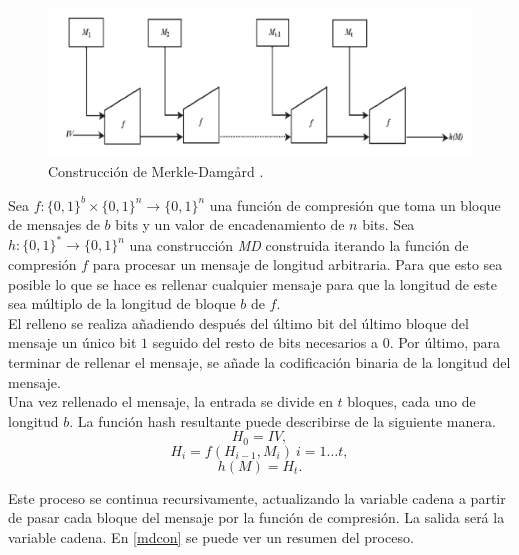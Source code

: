 \begin{figure}[htb]
	\centering
	\includegraphics[scale=0.3]{imagenes/md1.png} 
	\caption{Construcción de Merkle-Damgård \cite{Tiwari2017}.}
\end{figure}
Sea $f:\{0,1\}^b\times\{0,1\}^n\rightarrow\{0,1\}^n$ una función de compresión que toma un bloque de mensajes de $b$ bits y un valor de encadenamiento de $n$ bits. Sea $h:\{0,1\}^*\rightarrow\{0,1\}^n$ una construcción \emph{MD} construida iterando la función de compresión $f$ para procesar un mensaje de longitud arbitraria. Para que esto sea posible lo que se hace es rellenar cualquier mensaje para que la longitud de este sea múltiplo de la longitud de bloque $b$ de $f$.\\
El relleno se realiza añadiendo después del último bit del último bloque del mensaje un único bit $1$ seguido del resto de bits necesarios a $0$.
Por último, para terminar de rellenar el mensaje, se añade la codificación binaria de la longitud del mensaje.\\
Una vez rellenado el mensaje, la entrada se divide en $t$ bloques, cada uno de longitud $b$. La función hash resultante puede describirse de la siguiente manera.
$$
		H_0 = IV,
$$
$$
		H_i = f(H_{i-1},M_i)\:i=1\dots t,
$$
$$
		h(M)=H_t.
$$

Este proceso se continua recursivamente, actualizando la variable cadena a partir de pasar cada bloque del mensaje por la función de compresión. La salida será la variable cadena. En \ref{mdcon} se puede ver un resumen del proceso.

